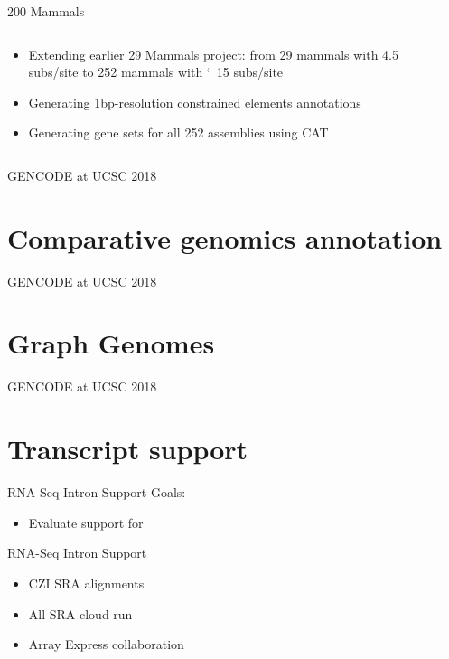 \documentclass[10pt,
               hyperref={bookmarks=false,
                         bookmarksopen=false,
                         colorlinks=true,
                         linkcolor=blue,
                         urlcolor=blue},
               xcolor={svgnames,table}]{beamer}
\newcommand{\sectionframe}[1]{
  \begin{frame}{GENCODE at UCSC 2018}
    \section{#1}
  \end{frame}
}
\begin{document}
\begin{frame}{200 Mammals}
  \begin{columns}
    \begin{column}{0.5\textwidth}
      \begin{itemize}
          \item Extending earlier 29 Mammals project: from 29 mammals with 4.5 subs/site to 252 mammals with \char`~15 subs/site
          \item Generating 1bp-resolution constrained elements annotations
          \item Generating gene sets for all 252 assemblies using CAT
      \end{itemize}
    \end{column}
    \begin{column}{0.5\textwidth}
    \end{column}
  \end{columns}
\end{frame}

\sectionframe{Comparative genomics annotation}

\sectionframe{Graph Genomes}

\sectionframe{Transcript support}
\begin{frame}{RNA-Seq Intron Support}
  Goals:
  
  \begin{itemize}
  \item Evaluate support for 
  \end{itemize}
\end{frame}

\begin{frame}{RNA-Seq Intron Support}
  \centering
  \begin{itemize}
  \item CZI SRA alignments
  \item All SRA cloud run
  \item Array Express collaboration
  \end{itemize}
\end{frame}
\end{document}
